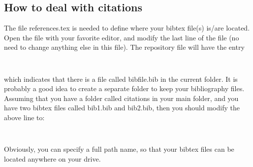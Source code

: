 \documentclass[DIV=calc, paper=letter, fontsize=11pt]{scrartcl}	 %
\begin{document}
\subsection{How to deal with citations\label{sec:references}}
The file \textsf{references.tex} is needed to define where your bibtex file(s) is/are located.  Open the file with
your favorite editor, and modify the last line of the file (no need to change anything else in this file).  
The repository file will have the entry
\begin{verbatim}
	
\end{verbatim}
which indicates that there is a file called \textsf{bibfile.bib} in the current folder.  It is probably a good 
idea to create a separate folder to keep your bibliography files.  Assuming that you have a folder called
\textsf{citations} in your main folder, and you have two bibtex files called \textsf{bib1.bib} and \textsf{bib2.bib},
then you should modify the above line to:
\begin{verbatim}
	
\end{verbatim}
Obviously, you can specify a full path name, so that your bibtex files can be located anywhere on your drive.
\end{document}
